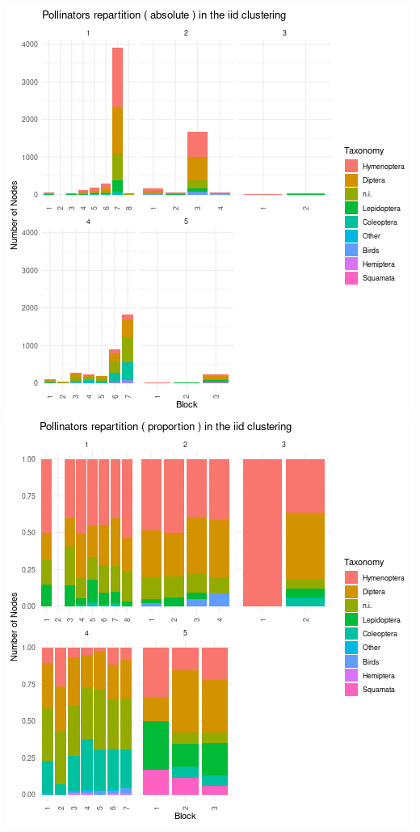 \includegraphics{./img/0bd4d6aa00bf51bbf8e966b7664bea52ace7bede.png}\includegraphics{./img/ba57007c0b13d1fdaa06e6b689f6aaa356359870.png}

